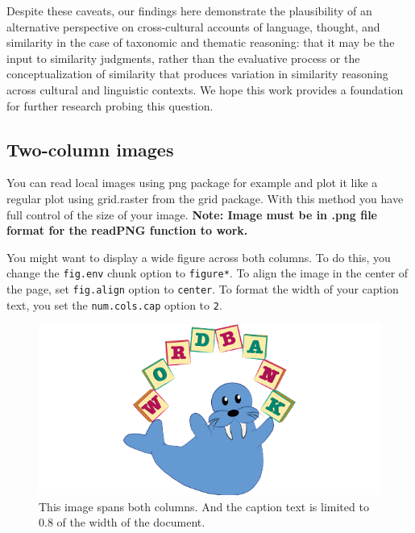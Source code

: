 \documentclass[10pt, letterpaper]{article}
\newenvironment{CodeChunk}{}{}
\begin{document}
Despite these caveats, our findings here demonstrate the plausibility of
an alternative perspective on cross-cultural accounts of language,
thought, and similarity in the case of taxonomic and thematic reasoning:
that it may be the input to similarity judgments, rather than the
evaluative process or the conceptualization of similarity that produces
variation in similarity reasoning across cultural and linguistic
contexts. We hope this work provides a foundation for further research
probing this question.

\newpage

\hypertarget{two-column-images}{%
\subsection{Two-column images}\label{two-column-images}}

You can read local images using png package for example and plot it like
a regular plot using grid.raster from the grid package. With this method
you have full control of the size of your image. \textbf{Note: Image
must be in .png file format for the readPNG function to work.}

You might want to display a wide figure across both columns. To do this,
you change the \texttt{fig.env} chunk option to \texttt{figure*}. To
align the image in the center of the page, set \texttt{fig.align} option
to \texttt{center}. To format the width of your caption text, you set
the \texttt{num.cols.cap} option to \texttt{2}.

\begin{CodeChunk}
\begin{figure}[h]

{\centering \includegraphics{figs/2-col-image-1} 

}

\caption[This image spans both columns]{This image spans both columns. And the caption text is limited to 0.8 of the width of the document.}\label{fig:2-col-image}
\end{figure}
\end{CodeChunk}
\end{document}
